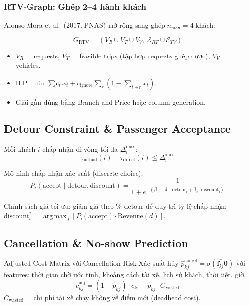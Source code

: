 \documentclass[12pt,a4paper]{article}
\DeclareMathOperator{\argmax}{arg\,max}
\begin{document}
\subsubsection{RTV-Graph: Ghép 2--4 hành khách}

Alonso-Mora et al.\ (2017, PNAS) mở rộng sang ghép $n_{\max}=4$ khách:

\begin{equation}
  G_{\mathrm{RTV}} = (V_R\cup V_T\cup V_V,\;\mathcal{E}_{RT}\cup\mathcal{E}_{TV})
\end{equation}

\begin{itemize}
  \item $V_R$ = requests, $V_T$ = feasible trips (tập hợp requests ghép được),
        $V_V$ = vehicles.
  \item ILP: $\min\sum c_t\,x_t + c_{\mathrm{ignore}}\sum_r(1-\sum_{t\ni r}x_t)$.
  \item Giải gần đúng bằng Branch-and-Price hoặc column generation.
\end{itemize}

\subsection{Detour Constraint \& Passenger Acceptance}

Mỗi khách $i$ chấp nhận đi vòng tối đa $\Delta_i^{\max}$:
\begin{equation}
  \tau_{\mathrm{actual}}(i) - \tau_{\mathrm{direct}}(i) \leq \Delta_i^{\max}
\end{equation}

Mô hình chấp nhận xác suất (discrete choice):
\begin{equation}
  P_i(\mathrm{accept}\mid\text{detour},\text{discount})
  = \frac{1}{1+e^{-(\beta_0 - \beta_1\cdot\mathrm{detour}_i + \beta_2\cdot\mathrm{discount}_i)}}
\end{equation}

Chính sách giá tối ưu: giảm giá theo \% detour để duy trì tỷ lệ chấp nhận:
$\mathrm{discount}_i^* = \argmax_d\left[P_i(\mathrm{accept})\cdot\mathrm{Revenue}(d)\right]$.

\subsection{Cancellation \& No-show Prediction}

\begin{ridebox}{Adjusted Cost Matrix với Cancellation Risk}
Xác suất hủy $\hat{p}_{kj}^{\mathrm{cancel}} = \sigma(\mathbf{f}_{kj}^\top\bm\theta)$ với
features: thời gian chờ ước tính, khoảng cách tài xế, lịch sử khách, thời tiết, giờ.
\begin{equation}
  c_{kj}^{\mathrm{adj}}
  = (1-\hat{p}_{kj})\cdot c_{kj}
  + \hat{p}_{kj}\cdot C_{\mathrm{wasted}}
\end{equation}
$C_{\mathrm{wasted}}$ = chi phí tài xế chạy không về điểm mới (deadhead cost).
\end{ridebox}
\end{document}
